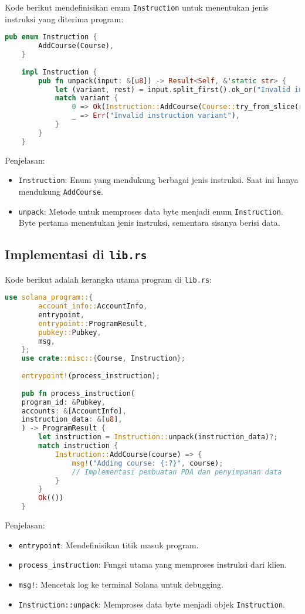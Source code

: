 Kode berikut mendefinisikan enum \texttt{Instruction} untuk menentukan jenis instruksi yang diterima program:

\begin{lstlisting}[language=Rust]
	pub enum Instruction {
		AddCourse(Course),
	}
	
	impl Instruction {
		pub fn unpack(input: &[u8]) -> Result<Self, &'static str> {
			let (variant, rest) = input.split_first().ok_or("Invalid instruction data")?;
			match variant {
				0 => Ok(Instruction::AddCourse(Course::try_from_slice(rest)?)),
				_ => Err("Invalid instruction variant"),
			}
		}
	}
\end{lstlisting}

Penjelasan:
\begin{itemize}
	\item \texttt{Instruction}: Enum yang mendukung berbagai jenis instruksi. Saat ini hanya mendukung \texttt{AddCourse}.
	\item \texttt{unpack}: Metode untuk memproses data byte menjadi enum \texttt{Instruction}. Byte pertama menentukan jenis instruksi, sementara sisanya berisi data.
\end{itemize}

\subsection{Implementasi di \texttt{lib.rs}}
Kode berikut adalah kerangka utama program di \texttt{lib.rs}:

\begin{lstlisting}[language=Rust]
	use solana_program::{
		account_info::AccountInfo,
		entrypoint,
		entrypoint::ProgramResult,
		pubkey::Pubkey,
		msg,
	};
	use crate::misc::{Course, Instruction};
	
	entrypoint!(process_instruction);
	
	pub fn process_instruction(
	program_id: &Pubkey,
	accounts: &[AccountInfo],
	instruction_data: &[u8],
	) -> ProgramResult {
		let instruction = Instruction::unpack(instruction_data)?;
		match instruction {
			Instruction::AddCourse(course) => {
				msg!("Adding course: {:?}", course);
				// Implementasi pembuatan PDA dan penyimpanan data
			}
		}
		Ok(())
	}
\end{lstlisting}

Penjelasan:
\begin{itemize}
	\item \texttt{entrypoint}: Mendefinisikan titik masuk program.
	\item \texttt{process\_instruction}: Fungsi utama yang memproses instruksi dari klien.
	\item \texttt{msg!}: Mencetak log ke terminal Solana untuk debugging.
	\item \texttt{Instruction::unpack}: Memproses data byte menjadi objek \texttt{Instruction}.
\end{itemize}

